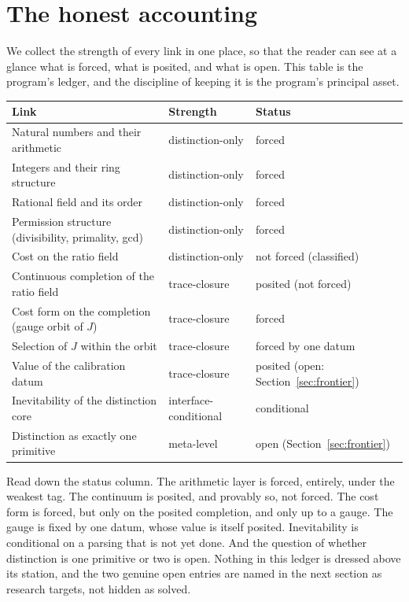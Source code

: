 \documentclass[11pt,a4paper]{article}
\theoremstyle{definition}
\theoremstyle{remark}
\begin{document}
\section{The honest accounting}\label{sec:accounting}

We collect the strength of every link in one place, so that the reader can see at a
glance what is forced, what is posited, and what is open. This table is the
program's ledger, and the discipline of keeping it is the program's principal
asset.

\begin{center}
\begin{tabular}{@{}lll@{}}
\toprule
\textbf{Link} & \textbf{Strength} & \textbf{Status} \\
\midrule
Natural numbers and their arithmetic & distinction-only & forced \\
Integers and their ring structure & distinction-only & forced \\
Rational field and its order & distinction-only & forced \\
Permission structure (divisibility, primality, gcd) & distinction-only & forced \\
Cost on the ratio field & distinction-only & not forced (classified) \\
Continuous completion of the ratio field & trace-closure & posited (not forced) \\
Cost form on the completion (gauge orbit of $J$) & trace-closure & forced \\
Selection of $J$ within the orbit & trace-closure & forced by one datum \\
Value of the calibration datum & trace-closure & posited (open: Section~\ref{sec:frontier}) \\
Inevitability of the distinction core & interface-conditional & conditional \\
Distinction as exactly one primitive & meta-level & open (Section~\ref{sec:frontier}) \\
\bottomrule
\end{tabular}
\end{center}

Read down the status column. The arithmetic layer is forced, entirely, under the
weakest tag. The continuum is posited, and provably so, not forced. The cost form
is forced, but only on the posited completion, and only up to a gauge. The gauge is
fixed by one datum, whose value is itself posited. Inevitability is conditional on
a parsing that is not yet done. And the question of whether distinction is one
primitive or two is open. Nothing in this ledger is dressed above its station, and
the two genuine open entries are named in the next section as research targets, not
hidden as solved.
\end{document}
